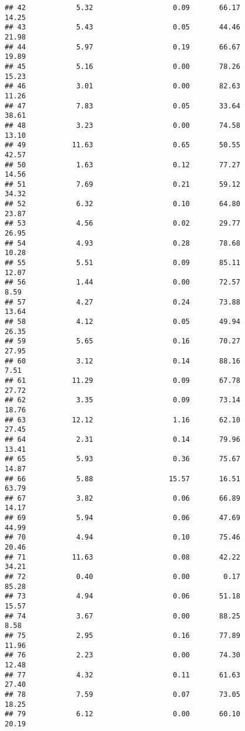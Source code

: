 \documentclass[
]{article}
\begin{document}
\begin{verbatim}
## 42            5.32                   0.09       66.17          14.25
## 43            5.43                   0.05       44.46          21.98
## 44            5.97                   0.19       66.67          19.89
## 45            5.16                   0.00       78.26          15.23
## 46            3.01                   0.00       82.63          11.26
## 47            7.83                   0.05       33.64          38.61
## 48            3.23                   0.00       74.58          13.10
## 49           11.63                   0.65       50.55          42.57
## 50            1.63                   0.12       77.27          14.56
## 51            7.69                   0.21       59.12          34.32
## 52            6.32                   0.10       64.80          23.87
## 53            4.56                   0.02       29.77          26.95
## 54            4.93                   0.28       78.68          10.28
## 55            5.51                   0.09       85.11          12.07
## 56            1.44                   0.00       72.57           8.59
## 57            4.27                   0.24       73.88          13.64
## 58            4.12                   0.05       49.94          26.35
## 59            5.65                   0.16       70.27          27.95
## 60            3.12                   0.14       88.16           7.51
## 61           11.29                   0.09       67.78          27.72
## 62            3.35                   0.09       73.14          18.76
## 63           12.12                   1.16       62.10          27.45
## 64            2.31                   0.14       79.96          13.41
## 65            5.93                   0.36       75.67          14.87
## 66            5.88                  15.57       16.51          63.79
## 67            3.82                   0.06       66.89          14.17
## 69            5.94                   0.06       47.69          44.99
## 70            4.94                   0.10       75.46          20.46
## 71           11.63                   0.08       42.22          34.21
## 72            0.40                   0.00        0.17          85.28
## 73            4.94                   0.06       51.18          15.57
## 74            3.67                   0.00       88.25           8.58
## 75            2.95                   0.16       77.89          11.96
## 76            2.23                   0.00       74.30          12.48
## 77            4.32                   0.11       61.63          27.40
## 78            7.59                   0.07       73.05          18.25
## 79            6.12                   0.00       60.10          20.19

\end{verbatim}
\end{document}
